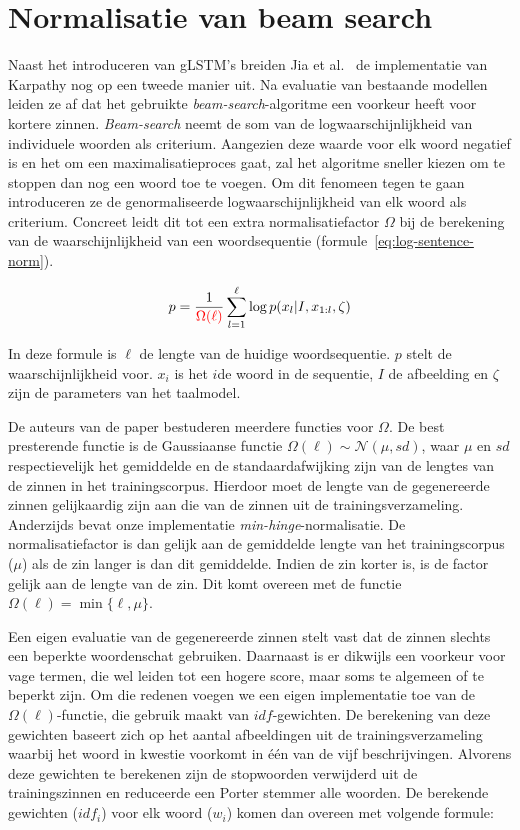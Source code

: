 \section{Normalisatie van beam search}
Naast het introduceren van gLSTM's breiden Jia et al.~\cite{Fernando2015} de implementatie van Karpathy nog op een tweede manier uit. Na evaluatie van bestaande modellen leiden ze af dat het gebruikte \emph{beam-search}-algoritme een voorkeur heeft voor kortere zinnen. \emph{Beam-search} neemt de som van de logwaarschijnlijkheid van individuele woorden als criterium. Aangezien deze waarde voor elk woord negatief is en het om een maximalisatieproces gaat, zal het algoritme sneller kiezen om te stoppen dan nog een woord toe te voegen. Om dit fenomeen tegen te gaan introduceren ze de genormaliseerde logwaarschijnlijkheid van elk woord als criterium. Concreet leidt dit tot een extra normalisatiefactor $\Omega$ bij de berekening van de waarschijnlijkheid van een woordsequentie (formule~\eqref{eq:log-sentence-norm}).

\begin{equation}
p = \frac{1}{\color{red}{\Omega(\ell)}}\sum_{l=1}^{\ell} \log p(x_l | I, x_{1:l}, \zeta)
\label{eq:log-sentence-norm}
\end{equation}

In deze formule is $\ell$ de lengte van de huidige woordsequentie. $p$ stelt de waarschijnlijkheid voor. $x_i$ is het $i$de woord in de sequentie, $I$ de afbeelding en $\zeta$ zijn de parameters van het taalmodel. 

De auteurs van de paper bestuderen meerdere functies voor $\Omega$. 
De best presterende functie is de Gaussiaanse functie $\Omega(\ell) \sim \mathcal{N}(\mu, sd)$, waar $\mu$ en $sd$ respectievelijk het gemiddelde en de standaardafwijking zijn van de lengtes van de zinnen in het trainingscorpus. Hierdoor moet de lengte van de gegenereerde zinnen gelijkaardig zijn aan die van de zinnen uit de trainingsverzameling. 
Anderzijds bevat onze implementatie \emph{min-hinge}-normalisatie. De normalisatiefactor is dan gelijk aan de gemiddelde lengte van het trainingscorpus ($\mu$) als de zin langer is dan dit gemiddelde. Indien de zin korter is, is de factor gelijk aan de lengte van de zin. Dit komt overeen met de functie $\Omega(\ell)=\min\{\ell, \mu\}$.

Een eigen evaluatie van de gegenereerde zinnen stelt vast dat de zinnen slechts een beperkte woordenschat gebruiken. Daarnaast is er dikwijls een voorkeur voor vage termen, die wel leiden tot een hogere score, maar soms te algemeen of te beperkt zijn.
Om die redenen voegen we een eigen implementatie toe van de $\Omega(\ell)$-functie, die gebruik maakt van $idf$-gewichten. De berekening van deze gewichten baseert zich op het aantal afbeeldingen uit de trainingsverzameling waarbij het woord in kwestie voorkomt in \'e\'en van de vijf beschrijvingen. Alvorens deze gewichten te berekenen zijn de stopwoorden verwijderd uit de trainingszinnen en reduceerde een Porter stemmer alle woorden. De berekende gewichten ($idf_i$) voor elk woord ($w_i$) komen dan overeen met volgende formule: 


